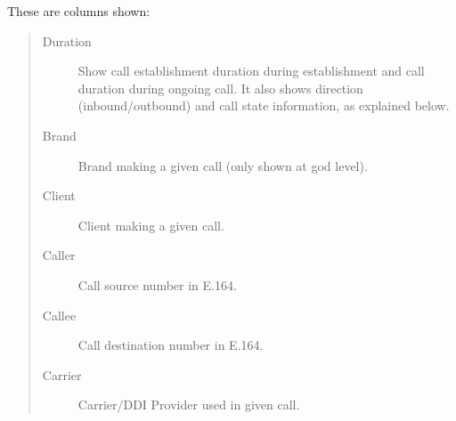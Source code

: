 \documentclass[letterpaper,10pt,english]{sphinxmanual}
\begin{document}
These are columns shown:
\begin{quote}
\begin{description}
\item[{Duration}] \leavevmode
Show call establishment duration during establishment and call duration during ongoing call. It also shows
direction (inbound/outbound) and call state information, as explained below.

\item[{Brand}] \leavevmode
Brand making a given call (only shown at god level).

\item[{Client}] \leavevmode
Client making a given call.

\item[{Caller}] \leavevmode
Call source number in E.164.

\item[{Callee}] \leavevmode
Call destination number in E.164.

\item[{Carrier}] \leavevmode
Carrier/DDI Provider used in given call.

\end{description}
\end{quote}
\end{document}
